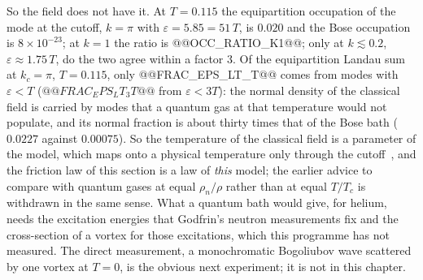 So the field does not have it. At $T=0.115$ the equipartition occupation of the mode at the cutoff, $k=\pi$ with $\varepsilon=5.85=51\,T$, is $0.020$ and the Bose occupation is $8\times10^{-23}$; at $k=1$ the ratio is @@OCC_RATIO_K1@@; only at $k\lesssim0.2$, $\varepsilon\approx1.75\,T$, do the two agree within a factor $3$. Of the equipartition Landau sum at $k_c=\pi$, $T=0.115$, only
@@FRAC_EPS_LT_T@@ comes from modes with $\varepsilon<T$ ($@@FRAC_EPS_LT_3T@@$ from $\varepsilon<3T$): the normal density of the classical field is carried by modes that a quantum gas at that temperature would not populate, and its normal fraction is about thirty times that of the Bose bath ($0.0227$ against $0.00075$). So the temperature of the classical field is a parameter of the model, which maps onto a physical
temperature only through the cutoff~\cite{Callens2026b}, and the friction law of this section is a law of \emph{this} model; the earlier advice to compare with quantum gases at equal $\rho_n/\rho$ rather than at equal $T/T_c$ is withdrawn in the same sense. What a quantum bath would give, for helium, needs the excitation energies that Godfrin's neutron measurements fix and the cross-section of a vortex for those excitations,
which this programme has not measured. The direct measurement, a monochromatic Bogoliubov wave scattered by one vortex at $T=0$, is the obvious next experiment; it is not in this chapter.
